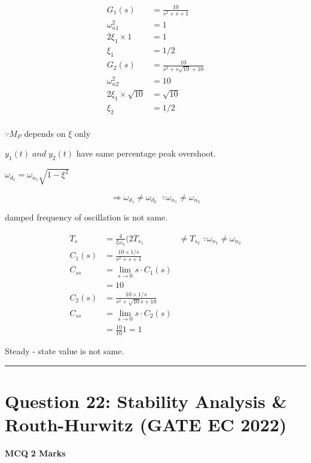 \documentclass[11pt,a4paper]{article}
\begin{document}
\begin{tcolorbox}[solbox, title=Detailed Solution -- Question 21]
\[
\begin{aligned}
G_1(s)&=\frac{10}{s^2+s+1}\\
\omega _{n1}^2&=1\\
2\xi _1 \times 1&=1\\
\xi _1&=1/2\\
G_2(s)&=\frac{10}{s^2+s\sqrt{10}+10}\\
\omega _{n2}^2&=10\\
2\xi _1 \times \sqrt{10}&=\sqrt{10}\\
\xi _2&=1/2\\
\end{aligned}
\]

$\because M_P$  depends on
$\xi$ only

$y_1(t) \; and \; y_2(t)$ have same percentage peak
overshoot.

$\omega _{d_1}=\omega _{n_1}\sqrt{1-\xi ^2}$

\[
\Rightarrow \omega _{d_1}\neq \omega _{d_2} \;\; \because \omega _{n_1}\neq \omega _{n_2}
\]

damped frequency of oscillation is not same.

\[
\begin{aligned}
T_s &=\frac{4}{\xi \omega _n}(2%
T_{s_1} &\neq  T_{s_2} \;\because \omega _{n_1}\neq \omega _{n_2}\\
C_1(s) &= \frac{10 \times 1/s}{s^2+s+1}\\
C_{ss} &=\lim_{s \to 0}s\cdot C_1(s) \\
&= 10\\
C_2(s) &= \frac{10 \times 1/s}{s^2+\sqrt{10}s+10}\\
C_{ss} &=\lim_{s \to 0}s\cdot C_2(s) \\
&= \frac{10}{10}1=1
\end{aligned}
\]

Steady - state value is not same.
\end{tcolorbox}

\vspace{1.5em}
\hrule
\vspace{1.5em}

\section*{Question 22: Stability Analysis \& Routh-Hurwitz (GATE EC 2022)}
\noindent \textbf{\color{primary}MCQ} \hfill \textbf{\color{secondary}2 Marks}
\end{document}
